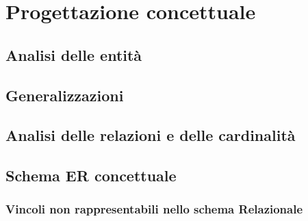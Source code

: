 \chapter{Progettazione concettuale}

\section{Analisi delle entità}

\section{Generalizzazioni}

\section{Analisi delle relazioni e delle cardinalità}

\section{Schema ER concettuale}

\subsection{Vincoli non rappresentabili nello schema Relazionale}